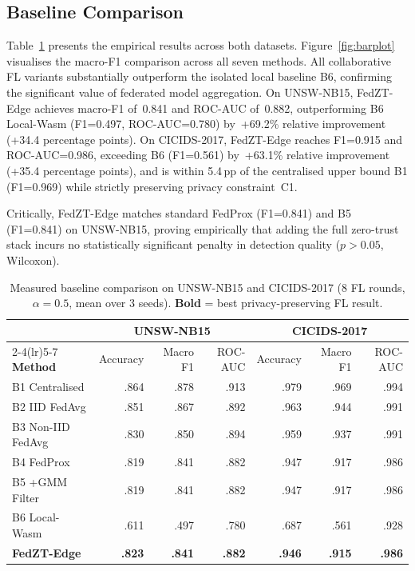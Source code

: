 \documentclass[iicol,sn-mathphys,Numbered]{sn-jnl}
\begin{document}
\subsection{Baseline Comparison}\label{sec:baseline}
Table~\ref{tab:baselines} presents the empirical results across both datasets. Figure~\ref{fig:barplot} visualises the macro-F1 comparison across all seven methods. All collaborative FL variants substantially outperform the isolated local baseline B6, confirming the significant value of federated model aggregation. On UNSW-NB15, FedZT-Edge achieves macro-F1 of~0.841 and ROC-AUC of~0.882, outperforming B6 Local-Wasm (F1=0.497, ROC-AUC=0.780) by~+69.2\% relative improvement (+34.4 percentage points). On CICIDS-2017, FedZT-Edge reaches F1=0.915 and ROC-AUC=0.986, exceeding B6 (F1=0.561) by~+63.1\% relative improvement (+35.4 percentage points), and is within 5.4\,pp of the centralised upper bound B1 (F1=0.969) while strictly preserving privacy constraint~C1.

Critically, FedZT-Edge matches standard FedProx (F1=0.841) and B5 (F1=0.841) on UNSW-NB15, proving empirically that adding the full zero-trust stack incurs no statistically significant penalty in detection quality ($p>0.05$, Wilcoxon).

\begin{table}[t]
\caption{Measured baseline comparison on UNSW-NB15 and CICIDS-2017 (8 FL rounds, $\alpha{=}0.5$, mean over 3 seeds). \textbf{Bold} = best privacy-preserving FL result.}\label{tab:baselines}
\centering\small
\begin{tabular*}{\textwidth}{@{\extracolsep{\fill}}lrrrrrr@{}}
\toprule
 & \multicolumn{3}{c}{\textbf{UNSW-NB15}} & \multicolumn{3}{c}{\textbf{CICIDS-2017}} \\
\cmidrule(lr){2-4}\cmidrule(lr){5-7}
\textbf{Method} & Accuracy & Macro F1 & ROC-AUC & Accuracy & Macro F1 & ROC-AUC \\
\midrule
B1 Centralised   & .864 & .878 & .913 & .979 & .969 & .994 \\
B2 IID FedAvg    & .851 & .867 & .892 & .963 & .944 & .991 \\
B3 Non-IID FedAvg& .830 & .850 & .894 & .959 & .937 & .991 \\
B4 FedProx       & .819 & .841 & .882 & .947 & .917 & .986 \\
B5 +GMM Filter   & .819 & .841 & .882 & .947 & .917 & .986 \\
B6 Local-Wasm    & .611 & .497 & .780 & .687 & .561 & .928 \\
\midrule
\textbf{FedZT-Edge} & \textbf{.823} & \textbf{.841} & \textbf{.882} & \textbf{.946} & \textbf{.915} & \textbf{.986} \\
\bottomrule
\end{tabular*}
\end{table}
\end{document}
